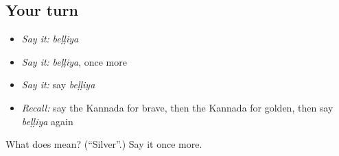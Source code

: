 \subsection*{Your turn}
\begin{itemize}
\raggedright
  \item \emph{Say it:} \emph{beḷḷiya}
  \item \emph{Say it:} \emph{beḷḷiya}, once more
  \item \emph{Say it:} say \emph{beḷḷiya}
  \item \emph{Recall:} say the Kannada for brave, then the Kannada for golden, then say \emph{beḷḷiya} again
\end{itemize}

\begin{tcolorbox}[breakable,colback=teal!4,colframe=teal!35!black,title={Before you move on}]
What does  mean? (\textquotedblleft{}Silver\textquotedblright{}.) Say it once more.
\end{tcolorbox}
